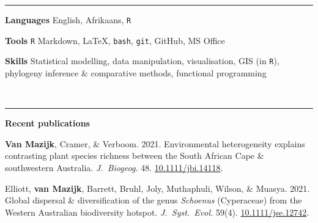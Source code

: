 \documentclass[12pt]{article}
\begin{document}
\bigskip

\hrule %

\bigskip

\textbf{Languages}     \hfill                  English, Afrikaans, \texttt{R}

\textbf{Tools    }     \hfill                            \texttt{R} Markdown,
                                        {\selectfont \LaTeX},
                               \texttt{bash}, \texttt{git}, GitHub, MS Office

\textbf{Skills  }      \hfill Statistical modelling, data manipulation, visualisation, GIS (in \texttt{R}), \\
                       \hfill phylogeny inference \& comparative methods, functional programming

\

\hrule %

\bigskip

\textbf{Recent publications}

\vskip5pt

\textbf{Van Mazijk}, Cramer, \& Verboom. 2021.  Environmental heterogeneity explains contrasting plant species richness between the South African Cape \& southwestern Australia. \textit{J.~Biogeog.} 48. \href{https://doi.org/10.1111/jbi.14118}{10.1111/jbi.14118}.

Elliott, \textbf{van Mazijk}, Barrett, Bruhl, Joly, Muthaphuli, Wilson, \& Muasya. 2021. Global dispersal \& diversification of the genus \textit{Schoenus} (Cyperaceae) from the Western Australian biodiversity hotspot. \textit{J.~Syst.~Evol.} 59(4). \href{https://doi.org/10.1111/jse.1274}{10.1111/jse.12742}.
\end{document}
